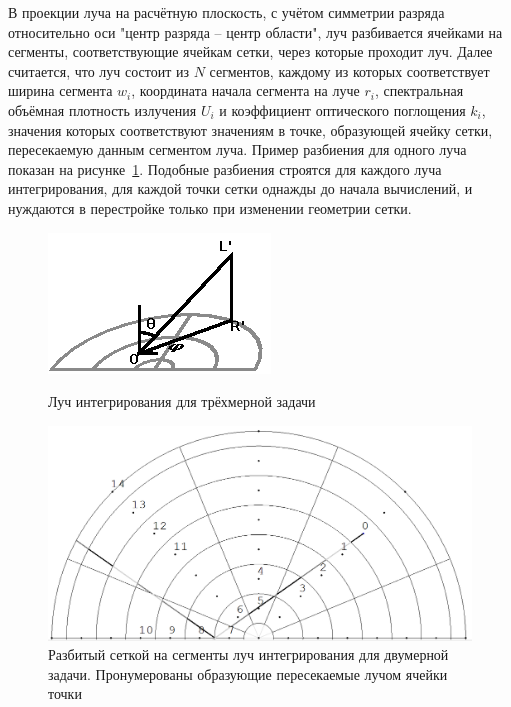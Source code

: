 В проекции луча на расчётную плоскость, с учётом симметрии разряда относительно 
оси "центр разряда -- центр области", луч разбивается ячейками на сегменты, 
соответствующие ячейкам сетки, через которые проходит луч. Далее считается, что 
луч состоит из $N$ сегментов, каждому из которых соответствует ширина сегмента 
$w_i$, координата начала сегмента на луче $r_i$, спектральная объёмная 
плотность излучения $U_i$ и коэффициент оптического поглощения $k_i$, значения 
которых соответствуют значениям в точке, образующей ячейку сетки, пересекаемую 
данным сегментом луча. 
Пример разбиения для одного луча показан на рисунке~\ref{fig:ray2d}. Подобные 
разбиения строятся для каждого луча интегрирования, для каждой точки сетки 
однажды до начала вычислений, и нуждаются в перестройке только при изменении 
геометрии сетки. 

\begin{figure}
    \centering
    \begin{minipage}{.48\linewidth}
        \centering
        \includegraphics[width=\linewidth]{img/luminInt/ray}    
        \caption{Луч интегрирования для трёхмерной задачи}
        \label{fig:ray3d}
    \end{minipage}
    \hfil
    \begin{minipage}{.48\linewidth}
        \centering
        \includegraphics[width=\linewidth]{img/luminInt/intsingle}    
        \caption{Разбитый сеткой на сегменты луч интегрирования для двумерной 
        задачи. Пронумерованы образующие пересекаемые лучом ячейки точки}
        \label{fig:ray2d}
    \end{minipage}
\end{figure}

